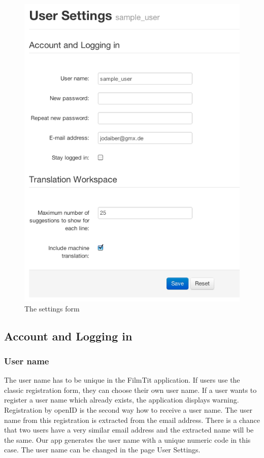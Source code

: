 \begin{figure}[h]
\begin{center}
\includegraphics[scale=0.4]{figures/user_manual/user_settings.png}
\end{center}
\caption{The settings form}
\label{fig:settings}
\end{figure}

\subsection{Account and Logging in}
\subsubsection{User name}

The user name has to be unique in the FilmTit application. If users use the classic registration form, they can choose their own user name. If a user wants to register a user name which already exists, the application displays warning. Registration by openID is the second way how to receive a user name. The user name from this registration is extracted from the email address.
There is a chance that two users have a very similar email address and the extracted name will be the same. Our app generates the user name with a unique numeric code in this case. 
The user name can be changed in the page User Settings.



